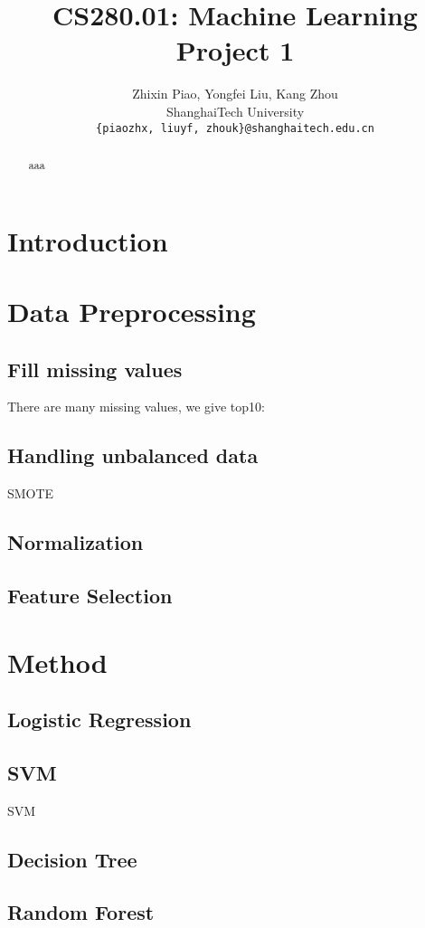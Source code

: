 \documentclass[10pt,twocolumn,letterpaper]{article}
\begin{document}
\title{CS280.01: Machine Learning\\ Project 1}

\author{Zhixin Piao, Yongfei Liu, Kang Zhou\\
ShanghaiTech University\\
{\tt\small { \{piaozhx, liuyf, zhouk\}@shanghaitech.edu.cn}
}}

\maketitle

\begin{abstract}
   aaa
\end{abstract}

\section{Introduction}


\section{Data Preprocessing}
\subsection{Fill missing values}
There are many missing values, we give top10:


\subsection{Handling unbalanced data}
SMOTE

\subsection{Normalization}


\subsection{Feature Selection}



\section{Method}
\subsection{Logistic Regression}

\subsection{SVM}
SVM\cite{SVM}


\subsection{Decision Tree}

\subsection{Random Forest}



{\small


}
\end{document}
